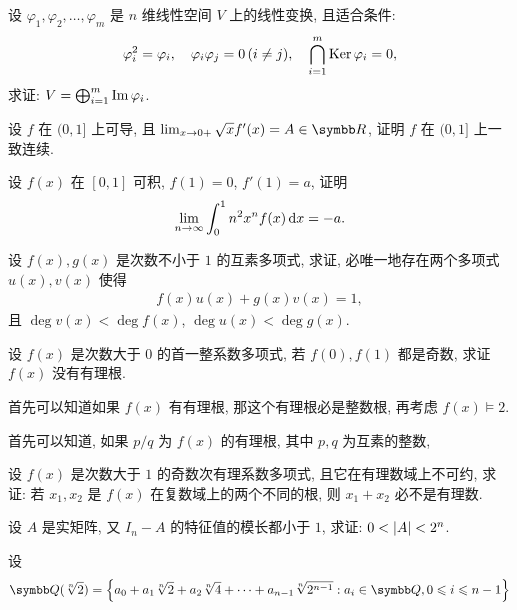\documentclass{ctexart}
\begin{document}
\begin{exercise}[series=exer]
\begin{answer}
\begin{answersheet}
        \end{answersheet}
    \end{answer}
    \item 设 $ \varphi_{1}, \varphi_{2}, \dots, \varphi_{m} $ 是 $ n $ 维线性空间 $ V $ 上的线性变换, 且适合条件:
    \begin{align*}
        \varphi_{i}^{2} = \varphi_{i}, \quad \varphi_{i}\varphi_{j} = 0\,(i\ne j), \quad \bigcap_{i=1}^{m}\operatorname{Ker}\varphi_{i} = 0,
    \end{align*}
    求证: $ V = \bigoplus_{i=1}^{m}\operatorname{Im}\varphi_{i} $. 
    \item 设 $ f $ 在 $ (0, 1] $ 上可导, 且 $ \limit{x}{0+} \sqrt{x} f'(x) = A \in \R $, 证明 $ f $ 在 $ (0, 1] $ 上一致连续. 
    \item 设 $ f(x) $ 在 $ [0, 1] $ 可积, $ f(1) = 0 $, $ f'(1) = a $, 证明
    \begin{align*}
        \lim_{n \to \infty}\int_{0}^{1}n^{2}x^{n}f(x)\dd{x} = -a.
    \end{align*}
    \item 设 $ f(x), g(x) $ 是次数不小于 $ 1 $ 的互素多项式, 求证, 必唯一地存在两个多项式 $ u(x), v(x) $ 使得
    \begin{align*}
        f(x)u(x) + g(x)v(x) = 1,
    \end{align*}
    且 $ \deg v(x) < \deg f(x) $, $ \deg u(x) < \deg g(x) $.  
    \item 设 $ f(x) $ 是次数大于 $ 0 $ 的首一整系数多项式, 若 $ f(0), f(1) $ 都是奇数, 求证 $ f(x) $ 没有有理根.
    \begin{hint}
        首先可以知道如果 $ f(x) $ 有有理根, 那这个有理根必是整数根, 再考虑 $ f(x) \models 2 $. 
    \end{hint}
    \begin{answer}
        首先可以知道, 如果 $ p/q $ 为 $ f(x) $ 的有理根, 其中 $ p, q $ 为互素的整数, 
    \end{answer}
    \item 设 $ f(x) $ 是次数大于 $ 1 $ 的奇数次有理系数多项式, 且它在有理数域上不可约, 求证: 若 $ x_{1}, x_{2} $ 是 $ f(x) $ 在复数域上的两个不同的根, 则 $ x_{1} + x_{2} $ 必不是有理数.
    \item 设 $ A $ 是实矩阵, 又 $ I_{n} - A $ 的特征值的模长都小于 $ 1 $, 求证: $ 0<\abs{A}<2^{n} $. 
    \item 设
    \begin{align*}
        \Q(\sqrt[n]{2}) = \set{a_{0} + a_{1}\sqrt[n]{2} + a_{2}\sqrt[n]{4} + \dots + a_{n-1}\sqrt[n]{2^{n-1}} : a_{i} \in \Q, 0\le i\le n-1}
    \end{align*}

\end{exercise}
\end{document}
